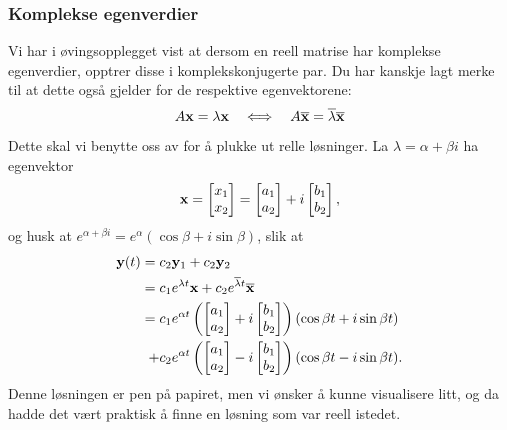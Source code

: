 \subsubsection*{Komplekse egenverdier}
Vi har i øvingsopplegget vist at dersom en reell matrise har komplekse egenverdier, opptrer disse i komplekskonjugerte par.
Du har kanskje lagt merke til at dette også gjelder for de respektive egenvektorene:
\[
A\mathbf{x}=\lambda \mathbf{x} \quad \Longleftrightarrow \quad A \overline {\mathbf{x}} =\overline{ \lambda} \overline {\mathbf{x}}
\]

Dette skal vi benytte oss av for å plukke ut relle løsninger. La $\lambda=\alpha+\beta i$ ha egenvektor 
\[\mathbf{x}=\begin{bmatrix}  x_{1} \\ x_{2}\end{bmatrix}=\begin{bmatrix}  a_{1} \\ a_{2}\end{bmatrix}+i\begin{bmatrix}  b_{1} \\ b_{2}\end{bmatrix},\]
og husk at $e^{\alpha+\beta i}=e^{\alpha}(\cos \beta +i\sin{\beta})$, slik at
\begin{align*}
\mathbf{y}(t)=\;&c_2\mathbf{y}_1 +c_2\mathbf{y}_2 \\ =\;&c_1e^{\lambda t}\mathbf{x} +c_2e^{\overline{\lambda} t}\overline{\mathbf{x}} \\ =\;&c_1e^{\alpha t}\left(\begin{bmatrix}  a_{1} \\ a_{2}\end{bmatrix}+i\begin{bmatrix}  b_{1} \\ b_{2}\end{bmatrix}\right)(\cos{\beta t}+i\sin{\beta t})\\+&c_2e^{\alpha t}\left(\begin{bmatrix}  a_{1} \\ a_{2}\end{bmatrix}-i\begin{bmatrix}  b_{1} \\ b_{2}\end{bmatrix}\right) (\cos{\beta t}-i\sin{\beta t}).
\end{align*}
Denne løsningen er pen på papiret, men vi ønsker å kunne visualisere litt, og da hadde det vært praktisk å finne en løsning som var reell istedet. 

